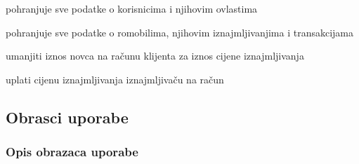\begin{packed_enum}
\begin{packed_enum}
			
			\end{packed_enum}
			\item  {}

			\begin{packed_enum}
				
				\item pohranjuje sve podatke o korisnicima i njihovim ovlastima
				
				\item pohranjuje sve podatke o romobilima, njihovim iznajmljivanjima i transakcijama
				
				
				
			\end{packed_enum}
			
			\item  {}
			
			\begin{packed_enum}
				
			\item umanjiti iznos novca na računu klijenta za iznos cijene iznajmljivanja
			
			\item uplati cijenu iznajmljivanja iznajmljivaču na račun
			
			
			
			\end{packed_enum}
		\end{packed_enum}
			
			\eject 
			
			
				
			\subsection{Obrasci uporabe}
				
			
				
				\subsubsection{Opis obrazaca uporabe}
					
